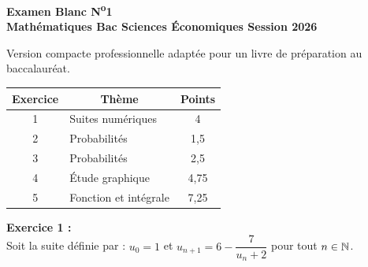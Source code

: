 
\cleardoublepage
{}
\thispagestyle{empty}

\begin{center}
  {\LARGE\bfseries\color{navy} Examen Blanc N\textsuperscript{o}1}\\[0.3cm]
  {\large\bfseries Math\'{e}matiques \textemdash{} Bac Sciences \'{E}conomiques \textemdash{} Session 2026}
\end{center}

\smallskip
{\small Version compacte professionnelle adapt\'{e}e pour un livre de pr\'{e}paration au baccalaur\'{e}at.}
\smallskip

\begin{center}
\renewcommand{\arraystretch}{1.3}
\begin{tabular}{|c|l|c|}
  \hline
  \rowcolor{navylight}
  \textbf{\color{navy}Exercice} & \multicolumn{1}{c|}{\textbf{\color{navy}Th\`{e}me}} & \textbf{\color{navy}Points} \\
  \hline
  1 & Suites num\'{e}riques & 4 \\
  \hline
  2 & Probabilit\'{e}s & 1,5 \\
  \hline
  3 & Probabilit\'{e}s & 2,5 \\
  \hline
  4 & \'{E}tude graphique & 4,75 \\
  \hline
  5 & Fonction et int\'{e}grale & 7,25 \\
  \hline
\end{tabular}
\end{center}

\bigskip

\noindent\textbf{Exercice 1 :}\\
Soit la suite d\'{e}finie par :
$u_0 = 1$ \quad et \quad $u_{n+1} = 6 - \dfrac{7}{u_n + 2}$ \quad pour tout $n \in \mathbb{N}$.

